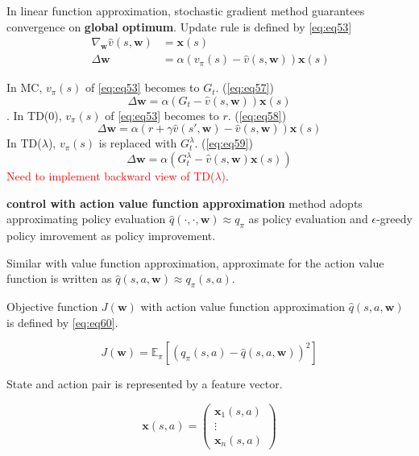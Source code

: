\documentclass[
	10pt, %
]{article}
\theoremstyle{plain}
\newcommand{\mbb}[1]{\mathbb{#1}}
\newcommand{\mb}[1]{\mathbf{#1}}
\newcommand{\tb}[1]{\textbf{#1}}
\numberwithin{equation}{subsection} %
\begin{document}
In linear function approximation, stochastic gradient method guarantees convergence on \tb{global optimum}. 
Update rule is defined by \cref{eq:eq53}
\begin{equation} \label{eq:eq53}\
    \begin{aligned}
    \nabla_\mb{w} \hat{v}(s,\mb{w}) &= \mb{x}(s) \\
    \Delta \mb{w} &= \alpha (v_\pi(s) - \hat{v}(s, \mb{w}))\mb{x}(s)
    \end{aligned}
\end{equation}

In MC, $v_\pi(s)$ of \cref{eq:eq53} becomes to $G_t$. (\cref{eq:eq57})
\begin{equation} \label{eq:eq57}
    \Delta \mb{w} = \alpha (G_t - \hat{v}(s, \mb{w}))\mb{x}(s)
\end{equation}.
In TD(0), $v_\pi(s)$ of \cref{eq:eq53} becomes to $r$. (\cref{eq:eq58})
\begin{equation} \label{eq:eq58}
    \Delta \mb{w} = \alpha (r + \gamma \hat{v}(s', \mb{w}) - \hat{v}(s, \mb{w}))\mb{x}(s)
\end{equation}
In TD($\lambda$), $v_\pi(s)$ is replaced with $G^\lambda_t$. (\cref{eq:eq59})
\begin{equation} \label{eq:eq59} 
    \Delta \mb{w} = \alpha (G^\lambda_t - \hat{v}(s, \mb{w})\mb{x}(s))
\end{equation}
\textcolor{red}{Need to implement backward view of TD($\lambda$)}.

\tb{control with action value function approximation} method adopts approximating policy evaluation $\hat{q}(\cdot, \cdot, \mb{w}) \approx q_\pi$ as policy evaluation and $\epsilon$-greedy policy imrovement as policy improvement.

Similar with value function approximation, approximate for the action value function is written as $\hat{q}(s, a, \mb{w}) \approx q_\pi(s,a)$.

Objective function $J(\mb{w})$ with action value function approximation $\hat{q}(s, a, \mb{w})$ is defined by \cref{eq:eq60}.

\begin{equation} \label{eq:eq60}
    J(\mb{w}) = \mbb{E}_\pi[(q_\pi(s, a) - \hat{q}(s, a, \mb{w}))^2]
\end{equation}

State and action pair is represented by a feature vector.

\begin{equation} \label{eq:eq62}
    \mb{x}(s,a) = \begin{pmatrix}
        \mb{x}_1(s,a)\\\vdots\\\mb{x}_n(s,a)
    \end{pmatrix}
\end{equation}
\end{document}

